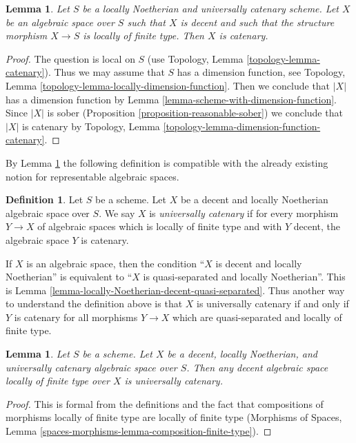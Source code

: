 \documentclass{stacks-project}
\theoremstyle{plain}
\newtheorem{lemma}[subsection]{Lemma}
\theoremstyle{definition}
\newtheorem{definition}[subsection]{Definition}
\theoremstyle{remark}
\numberwithin{equation}{subsection}
\begin{document}
\begin{lemma}
\label{lemma-universally-catenary-scheme}
Let $S$ be a locally Noetherian and universally catenary scheme.
Let $X$ be an algebraic space over $S$ such that $X$ is decent
and such that the structure morphism $X \to S$ is locally of
finite type. Then $X$ is catenary.
\end{lemma}

\begin{proof}
The question is local on $S$ (use
Topology, Lemma \ref{topology-lemma-catenary}).
Thus we may assume that $S$ has a
dimension function, see Topology, Lemma
\ref{topology-lemma-locally-dimension-function}.
Then we conclude that $|X|$ has a dimension function by
Lemma \ref{lemma-scheme-with-dimension-function}.
Since $|X|$ is sober (Proposition \ref{proposition-reasonable-sober})
we conclude that $|X|$ is catenary by
Topology, Lemma \ref{topology-lemma-dimension-function-catenary}.
\end{proof}

\noindent
By Lemma \ref{lemma-universally-catenary-scheme}
the following definition is compatible with the
already existing notion for representable algebraic spaces.

\begin{definition}
\label{definition-universally-catenary}
Let $S$ be a scheme. Let $X$ be a decent and locally Noetherian
algebraic space over $S$. We say $X$ is {\it universally catenary}
if for every morphism $Y \to X$ of algebraic spaces which is 
locally of finite type and with $Y$ decent, the algebraic space
$Y$ is catenary.
\end{definition}

\noindent
If $X$ is an algebraic space, then the condition
``$X$ is decent and locally Noetherian'' is equivalent to
``$X$ is quasi-separated and locally Noetherian''. This is
Lemma \ref{lemma-locally-Noetherian-decent-quasi-separated}.
Thus another way to understand the definition above is that $X$
is universally catenary if and only if $Y$ is catenary for
all morphisms $Y \to X$ which are quasi-separated and locally of finite type.

\begin{lemma}
\label{lemma-universally-catenary}
Let $S$ be a scheme. Let $X$ be a decent, locally Noetherian, and
universally catenary algebraic space over $S$. Then any decent algebraic
space locally of finite type over $X$ is universally catenary.
\end{lemma}

\begin{proof}
This is formal from the definitions and the fact that
compositions of morphisms locally of finite type are
locally of finite type (Morphisms of Spaces, Lemma
\ref{spaces-morphisms-lemma-composition-finite-type}).
\end{proof}
\end{document}
